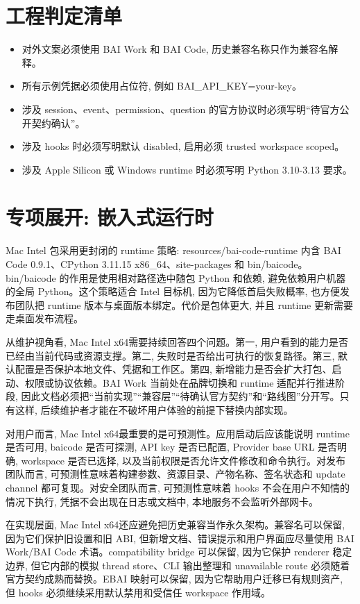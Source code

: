 \section{工程判定清单}
\begin{itemize}
  \item 对外文案必须使用 BAI Work 和 BAI Code, 历史兼容名称只作为兼容名解释。
  \item 所有示例凭据必须使用占位符, 例如 BAI\_API\_KEY=your-key。
  \item 涉及 session、event、permission、question 的官方协议时必须写明“待官方公开契约确认”。
  \item 涉及 hooks 时必须写明默认 disabled, 启用必须 trusted workspace scoped。
  \item 涉及 Apple Silicon 或 Windows runtime 时必须写明 Python 3.10-3.13 要求。
\end{itemize}

\section{专项展开: 嵌入式运行时}
Mac Intel 包采用更封闭的 runtime 策略: resources/bai-code-runtime 内含 BAI Code 0.9.1、CPython 3.11.15 x86\_64、site-packages 和 bin/baicode。bin/baicode 的作用是使用相对路径选中随包 Python 和依赖, 避免依赖用户机器的全局 Python。这个策略适合 Intel 目标机, 因为它降低首启失败概率, 也方便发布团队把 runtime 版本与桌面版本绑定。代价是包体更大, 并且 runtime 更新需要走桌面发布流程。

从维护视角看, Mac Intel x64需要持续回答四个问题。第一, 用户看到的能力是否已经由当前代码或资源支撑。第二, 失败时是否给出可执行的恢复路径。第三, 默认配置是否保护本地文件、凭据和工作区。第四, 新增能力是否会扩大打包、启动、权限或协议依赖。BAI Work 当前处在品牌切换和 runtime 适配并行推进阶段, 因此文档必须把“当前实现”“兼容层”“待确认官方契约”和“路线图”分开写。只有这样, 后续维护者才能在不破坏用户体验的前提下替换内部实现。

对用户而言, Mac Intel x64最重要的是可预测性。应用启动后应该能说明 runtime 是否可用, baicode 是否可探测, API key 是否已配置, Provider base URL 是否明确, workspace 是否已选择, 以及当前权限是否允许文件修改和命令执行。对发布团队而言, 可预测性意味着构建参数、资源目录、产物名称、签名状态和 update channel 都可复现。对安全团队而言, 可预测性意味着 hooks 不会在用户不知情的情况下执行, 凭据不会出现在日志或文档中, 本地服务不会监听外部网卡。

在实现层面, Mac Intel x64还应避免把历史兼容当作永久架构。兼容名可以保留, 因为它们保护旧设置和旧 ABI, 但新增文档、错误提示和用户界面应尽量使用 BAI Work/BAI Code 术语。compatibility bridge 可以保留, 因为它保护 renderer 稳定边界, 但它内部的模拟 thread store、CLI 输出整理和 unavailable route 必须随着官方契约成熟而替换。EBAI 映射可以保留, 因为它帮助用户迁移已有规则资产, 但 hooks 必须继续采用默认禁用和受信任 workspace 作用域。

